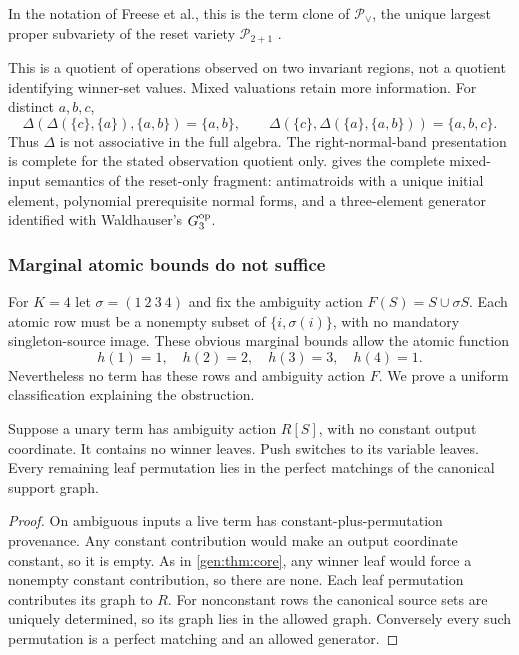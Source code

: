 In the notation of Freese et al., this is the term clone of
$\mathcal P_{\vee}$, the unique largest proper subvariety of the
reset variety $\mathcal P_{2+1}$
\cite[Theorems~3.1, 3.7--3.8]{FreeseEtAl2002}.

This is a quotient of operations observed on two invariant regions,
not a quotient identifying winner-set values. Mixed valuations retain
more information. For distinct $a,b,c$,
\[
 \Delta(\Delta(\{c\},\{a\}),\{a,b\})=\{a,b\},\qquad
 \Delta(\{c\},\Delta(\{a\},\{a,b\}))=\{a,b,c\}.
\]
Thus $\Delta$ is not associative in the full algebra. The right-normal-band
presentation is complete for the stated observation quotient only.
 gives the complete mixed-input
semantics of the reset-only fragment: antimatroids with a unique initial
element, polynomial prerequisite normal forms, and a three-element
generator identified with Waldhauser's $G_3^{\rm op}$\cite{Waldhauser2006}.

\subsubsection{Marginal atomic bounds do not suffice}

For $K=4$ let $\sigma=(1\ 2\ 3\ 4)$ and fix the ambiguity action
$F(S)=S\cup\sigma S$. Each atomic row must be a nonempty subset of
$\{i,\sigma(i)\}$, with no mandatory singleton-source image. These
obvious marginal bounds allow the atomic function
\[
 h(1)=1,\quad h(2)=2,\quad h(3)=3,\quad h(4)=1.
\]
Nevertheless no term has these rows and ambiguity action $F$.
We prove a uniform classification explaining the obstruction.

\begin{lemma}\label{gen:lem:local}
Suppose a unary term has ambiguity action $R[S]$, with no constant
output coordinate. It contains no winner leaves. Push switches to its
variable leaves.
Every remaining leaf permutation lies in the perfect matchings of the
canonical support graph.
\end{lemma}
\begin{proof}
On ambiguous inputs a live term has constant-plus-permutation provenance.
Any constant contribution would make an output coordinate constant,
so it is empty. As in \cref{gen:thm:core}, any winner leaf would force
a nonempty constant contribution, so there are none. Each leaf
permutation contributes its graph to $R$. For nonconstant rows the
canonical source sets are uniquely determined, so its graph lies in
the allowed graph. Conversely every such permutation is a perfect
matching and an allowed generator.
\end{proof}

